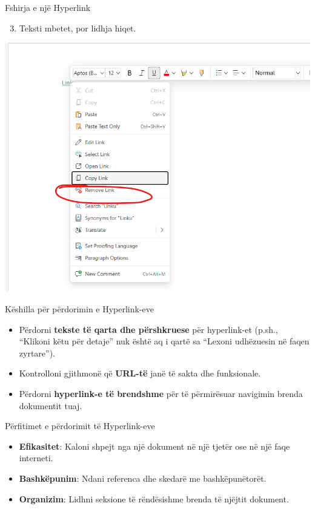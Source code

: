 \documentclass[
  ignorenonframetext,
]{beamer}
\providecommand{\tightlist}{%
  \setlength{\itemsep}{0pt}\setlength{\parskip}{0pt}}
\begin{document}
\begin{frame}{Fshirja e një Hyperlink}
\label{fshirja-e-njuxeb-hyperlink-1}
\begin{enumerate}
\setcounter{enumi}{2}
\tightlist
\item
  Teksti mbetet, por lidhja hiqet.
\end{enumerate}

\includegraphics{./images/word12.png}
\end{frame}

\begin{frame}{Këshilla për përdorimin e Hyperlink-eve}
\label{kuxebshilla-puxebr-puxebrdorimin-e-hyperlink-eve}
\begin{itemize}
\item
  Përdorni \textbf{tekste të qarta dhe përshkruese} për hyperlink-et
  (p.sh., ``Klikoni këtu për detaje'' nuk është aq i qartë sa ``Lexoni
  udhëzuesin në faqen zyrtare'').
\item
  Kontrolloni gjithmonë që \textbf{URL-të} janë të sakta dhe
  funksionale.
\item
  Përdorni \textbf{hyperlink-e të brendshme} për të përmirësuar
  navigimin brenda dokumentit tuaj.
\end{itemize}
\end{frame}

\begin{frame}{Përfitimet e përdorimit të Hyperlink-eve}
\label{puxebrfitimet-e-puxebrdorimit-tuxeb-hyperlink-eve}
\begin{itemize}
\item
  \textbf{Efikasitet}: Kaloni shpejt nga një dokument në një tjetër ose
  në një faqe interneti.
\item
  \textbf{Bashkëpunim}: Ndani referenca dhe skedarë me bashkëpunëtorët.
\item
  \textbf{Organizim}: Lidhni seksione të rëndësishme brenda të njëjtit
  dokument.
\end{itemize}
\end{frame}
\end{document}
